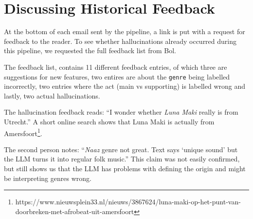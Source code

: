 \section{Discussing Historical Feedback}
At the bottom of each email sent by the pipeline, a link is put with a request for feedback to the reader. To see whether hallucinations already occurred during this pipeline, we requested the full feedback list from Bol. 

The feedback list, contains 11 different feedback entries, of which three are suggestions for new features, two entires are about the \texttt{genre} being labelled incorrectly, two entries where the act (main vs supporting) is labelled wrong and lastly, two actual hallucinations. 

The hallucination feedback reads: ``I wonder whether \textit{Luna Maki} really is from Utrecht.'' A short online search shows that Luna Maki is actually from Amersfoort\footnote{https://www.nieuwsplein33.nl/nieuws/3867624/luna-maki-op-het-punt-van-doorbreken-met-afrobeat-uit-amersfoort}.  

The second person notes: ``\textit{Naaz} genre not great. Text says `unique sound' but the LLM turns it into regular folk music.'' This claim was not easily confirmed, but still shows us that the LLM has problems with defining the origin and might be interpreting genres wrong. 